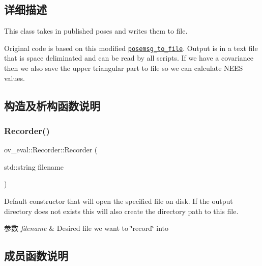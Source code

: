\subsection{详细描述}
This class takes in published poses and writes them to file. 

Original code is based on this modified \href{https://github.com/rpng/posemsg_to_file/}{\tt posemsg\+\_\+to\+\_\+file}. Output is in a text file that is space deliminated and can be read by all scripts. If we have a covariance then we also save the upper triangular part to file so we can calculate N\+E\+ES values. 

\subsection{构造及析构函数说明}
\mbox{\label{classov__eval_1_1Recorder_a36307659369029395731737a7577bf0a}} 
\subsubsection{\texorpdfstring{Recorder()}{Recorder()}}
{\footnotesize\ttfamily ov\+\_\+eval\+::\+Recorder\+::\+Recorder (\begin{DoxyParamCaption}\item[{std\+::string}]{filename }\end{DoxyParamCaption})\hspace{0.3cm}{\ttfamily [inline]}}



Default constructor that will open the specified file on disk. If the output directory does not exists this will also create the directory path to this file. 


\begin{DoxyParams}{参数}
{\em filename} & Desired file we want to \char`\"{}record\char`\"{} into \\
\hline
\end{DoxyParams}


\subsection{成员函数说明}
\mbox{\label{classov__eval_1_1Recorder_a731eae3cf076afc70a7e590f5e8943fe}} 
